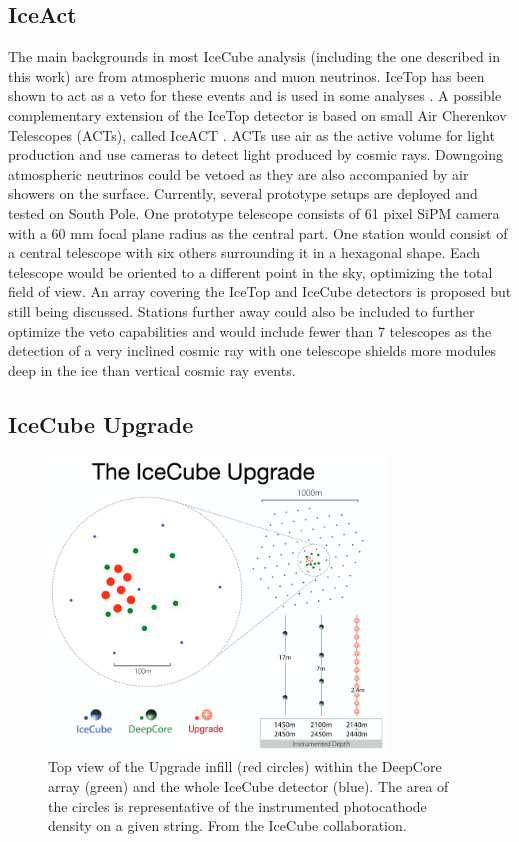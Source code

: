 \subsection{IceAct}
The main backgrounds in most IceCube analysis (including the one described in this work) are from atmospheric muons and muon neutrinos. IceTop has been shown to act as a veto for these events and is used in some analyses \cite{Tosi:2017zho}. A possible complementary extension of the IceTop detector is based on small Air Cherenkov Telescopes (ACTs), called IceACT \cite{Auffenberg:2017vwc}. ACTs use air as the active volume for light production and use cameras to detect light produced by cosmic rays. Downgoing atmospheric neutrinos could be vetoed as they are also accompanied by air showers on the surface. Currently, several prototype setups are deployed and tested on South Pole. One prototype telescope consists of 61 pixel SiPM camera with a 60 mm focal plane radius as the central part. One station would consist of a central telescope with six others surrounding it in a hexagonal shape. Each telescope would be oriented to a different point in the sky, optimizing the total field of view. An array covering the IceTop and IceCube detectors is proposed but still being discussed. Stations further away could also be included to further optimize the veto capabilities and would include fewer than 7 telescopes as the detection of a very inclined cosmic ray with one telescope shields more modules deep in the ice than vertical cosmic ray events.

\subsection{IceCube Upgrade}
\label{subsec:upgrade}
\begin{figure}[t]
\centering
\includegraphics[width=0.8\textwidth]{chapter5/img/upgrade.png}
\caption{Top view of the Upgrade infill (red circles) within the DeepCore array (green) and the whole IceCube detector (blue). The area of the circles is representative of the instrumented photocathode density on a given string. From the IceCube collaboration.}
\label{fig:upgrade}
\end{figure}

